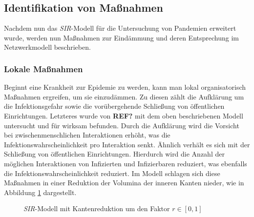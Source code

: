 \subsection{Identifikation von Maßnahmen}\steffen
Nachdem nun das \emph{SIR}-Modell für die Untersuchung von Pandemien erweitert wurde, werden nun Maßnahmen zur Eindämmung und deren Entsprechung im Netzwerkmodell beschrieben. 

\subsubsection{Lokale Maßnahmen}
Beginnt eine Krankheit zur Epidemie zu werden, kann man lokal organisatorisch Maßnahmen ergreifen, um sie einzudämmen. Zu diesen zählt die Aufklärung um die Infektionsgefahr sowie die vorübergehende Schließung von öffentlichen Einrichtungen. Letzteres wurde von \textbf{REF?} mit dem oben beschriebenen Modell untersucht und für wirksam befunden. Durch die Aufklärung wird die Vorsicht bei zwischenmenschlichen Interaktionen erhöht, was die Infektionswahrscheinlichkeit pro Interaktion senkt. Ähnlich verhält es sich mit der Schließung von öffentlichen Einrichtungen. Hierdurch wird die Anzahl der möglichen Interaktionen von Infizierten und Infizierbaren reduziert, was ebenfalls die Infektionswahrscheinlichkeit reduziert. Im Modell schlagen sich diese Maßnahmen in einer Reduktion der Volumina der inneren Kanten nieder, wie in Abbildung \ref{fig:ssec:actions:local} dargestellt.

\begin{figure}
\begin{center}
\end{center}
\caption{\emph{SIR}-Modell mit Kantenreduktion um den Faktor $r\in[0,1]$}\label{fig:ssec:actions:local}
\end{figure}


